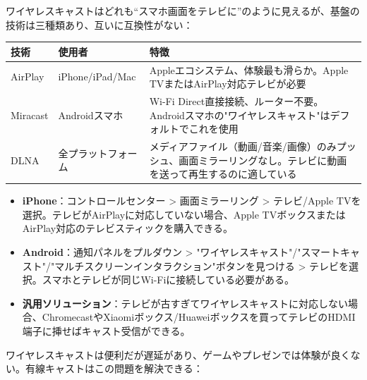 


ワイヤレスキャストはどれも“スマホ画面をテレビに”のように見えるが、基盤の技術は三種類あり、互いに互換性がない：

\begin{center}
\begin{tabularx}{\linewidth}{|X|X|X|}
\hline
\textbf{技術} & \textbf{使用者} & \textbf{特徴} \tabularnewline
\hline
AirPlay & iPhone/iPad/Mac & Appleエコシステム、体験最も滑らか。Apple TVまたはAirPlay対応テレビが必要 \tabularnewline
Miracast & Androidスマホ & Wi-Fi Direct直接接続、ルーター不要。Androidスマホの"ワイヤレスキャスト"はデフォルトでこれを使用 \tabularnewline
DLNA & 全プラットフォーム & メディアファイル（動画/音楽/画像）のみプッシュ、画面ミラーリングなし。テレビに動画を送って再生するのに適している \tabularnewline
\hline
\end{tabularx}
\end{center}


\begin{itemize}
  \item \textbf{iPhone}：コントロールセンター > 画面ミラーリング > テレビ/Apple TVを選択。テレビがAirPlayに対応していない場合、Apple TVボックスまたはAirPlay対応のテレビスティックを購入できる。
  \item \textbf{Android}：通知パネルをプルダウン > "ワイヤレスキャスト"/"スマートキャスト"/"マルチスクリーンインタラクション"ボタンを見つける > テレビを選択。スマホとテレビが同じWi-Fiに接続している必要がある。
  \item \textbf{汎用ソリューション}：テレビが古すぎてワイヤレスキャストに対応しない場合、ChromecastやXiaomiボックス/Huaweiボックスを買ってテレビのHDMI端子に挿せばキャスト受信ができる。
\end{itemize}


ワイヤレスキャストは便利だが遅延があり、ゲームやプレゼンでは体験が良くない。有線キャストはこの問題を解決できる：

